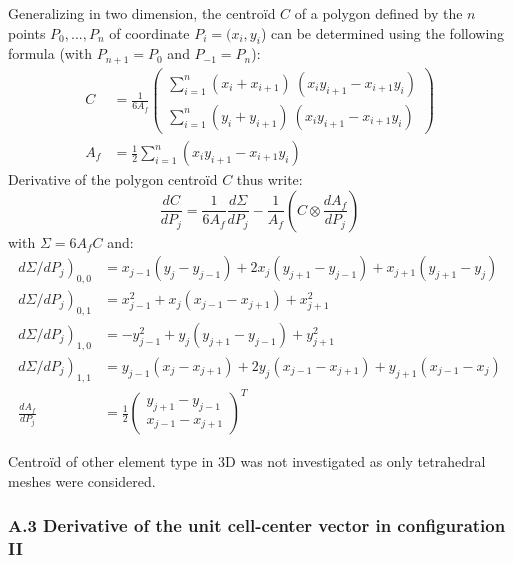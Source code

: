 \documentclass[11pt]{article}
\begin{document}
Generalizing in two dimension, the centroïd $C$ of a polygon defined by the $n$ points $P_0, ..., P_n$ of coordinate $P_i = (x_i, y_i$) can be determined using the following formula (with $P_{n+1} = P_0$ and $P_{-1} = P_n$):
\begin{equation}
\begin{aligned}
C &= \frac{1}{6A_f} \begin{pmatrix}
\sum_{i=1}^{n} (x_i + x_{i+1})\  (x_i y_{i+1} - x_{i+1} y_i) \\
\sum_{i=1}^{n} (y_i + y_{i+1})\  (x_i y_{i+1} - x_{i+1} y_i)
\end{pmatrix} \\
A_f &= \frac{1}{2} \sum_{i=1}^{n}  (x_i y_{i+1} - x_{i+1} y_i) 
\end{aligned}
\end{equation}
%
Derivative of the polygon centroïd $C$ thus write:
\begin{equation}
\frac{dC}{dP_j} = \frac{1}{6A_f} \frac{d \Sigma}{d P_j} - \frac{1}{A_f} \left( C \otimes \frac{d A_f}{d P_j} \right)
\end{equation}
with $\Sigma = 6 A_f C$ and:
\begin{subequations}
\begin{align}
\left. {d \Sigma}/{d P_j} \right)_{0,0} &= x_{j-1} (y_j - y_{j-1}) + 2x_j (y_{j+1} - y_{j-1}) + x_{j+1} (y_{j+1} - y_j)  \\
\left. {d \Sigma}/{d P_j} \right)_{0,1} &= x_{j-1}^2 + x_j (x_{j-1} - x_{j+1}) + x_{j+1}^2  \\
\left. {d \Sigma}/{d P_j} \right)_{1,0} &= - y_{j-1}^2 + y_j (y_{j+1} - y_{j-1}) + y_{j+1}^2  \\
\left. {d \Sigma}/{d P_j} \right)_{1,1} &= y_{j-1} (x_{j} - x_{j+1}) + 2y_j (x_{j-1} - x_{j+1}) + y_{j+1} (x_{j-1} - x_j) \\
\frac{d A_f}{d P_j} &= \frac{1}{2} \begin{pmatrix}
y_{j+1} - y_{j-1} \\ x_{j-1} - x_{j+1}
\end{pmatrix}^T
\end{align}
\end{subequations}
%

Centroïd of other element type in 3D was not investigated as only tetrahedral meshes were considered.

\subsubsection*{A.3 Derivative of the unit cell-center vector in configuration II}
\end{document}
